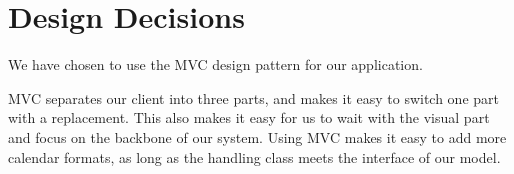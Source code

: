\section{Design Decisions}
We have chosen to use the MVC design pattern for our \CS application.

MVC separates our client into three parts, and makes it easy to switch one part with a replacement. This also makes it easy for us to wait with the visual part and focus on the backbone of our system.
Using MVC makes it easy to add more calendar formats, as long as the handling class meets the interface of our model.


\newpage